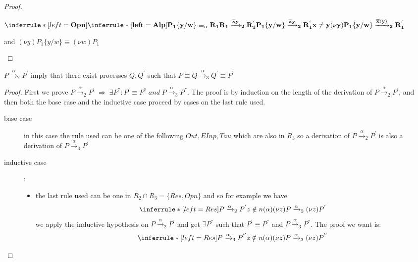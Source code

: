 \begin{lemma}
\begin{proof}
\begin{description}
	\begin{center}
	  $\inferrule* [left=\bf{Opn}]{
	      \inferrule* [left=\bf{Alp}]{
		  P_{1}\{y/w\} \equiv_{\alpha} R_{1}
		\\
		  R_{1} \xrightarrow{\overline{x}y}_{2} R_{1}^{'}
	      }{
		P_{1}\{y/w\} \xrightarrow{\overline{x}y}_{2} R_{1}^{'}
	      }
	    \\
	      x\neq y
	  }{
	    (\nu y)P_{1}\{y/w\} \xrightarrow{\overline{x}(y)}_{2} R_{1}^{'}
	  }$
	\end{center}
	and $(\nu y)P_{1}\{y/w\} \equiv (\nu w)P_{1}$
    \end{description}
  \end{proof}
\end{lemma}


\begin{theorem}
  $P\xrightarrow{\alpha}_{2} P^{'}$ imply that there exist processes $Q, Q^{'}$ such that  $P \equiv Q \xrightarrow{\alpha}_{3} Q^{'} \equiv P^{'}$
  \begin{proof}
	First we prove $P\xrightarrow{\alpha}_{2}P^{'}\; \Rightarrow\; \exists P^{''}: P^{'}\equiv P^{''}\; and\; P\xrightarrow{\alpha}_{3}P^{''}$. The proof is by induction on the length of the derivation of $P\xrightarrow{\alpha}_{2}P^{'}$, and then both the base case and the inductive case proceed by cases on the last rule used.
	\begin{description}
	  \item[base case]
	    in this case the rule used can be one of the following $Out, EInp, Tau$ which are also in $R_{3}$ so a derivation of $P\xrightarrow{\alpha}_{2}P^{'}$ is also a derivation of $P\xrightarrow{\alpha}_{3}P^{'}$
	  \item[inductive case]:
	    \begin{itemize}
	      \item 
		the last rule used can be one in $R_{2}\cap R_{3}=\{Res, Opn\}$ and so for example we have 
		\[
		  \inferrule* [left=Res]{
		      P\xrightarrow{\alpha}_{2} P^{'}
		    \\
		      z\notin n(\alpha)
		  }{
		    (\nu z) P\xrightarrow{\alpha}_{2}(\nu z) P^{'}
		  }
		\]
		we apply the inductive hypothesis on $P\xrightarrow{\alpha}_{2} P^{'}$ and get $\exists P^{''}$ such that $P^{'}\equiv P^{''}$ and $P\xrightarrow{\alpha}_{3} P^{''}$. The proof we want is:
		\[
		  \inferrule* [left=Res]{
		      P\xrightarrow{\alpha}_{3} P^{''}
		    \\
		      z\notin n(\alpha)
		  }{
		    (\nu z) P\xrightarrow{\alpha}_{3}(\nu z) P^{''}
}\]
\end{itemize}
\end{description}
\end{proof}
\end{theorem}
